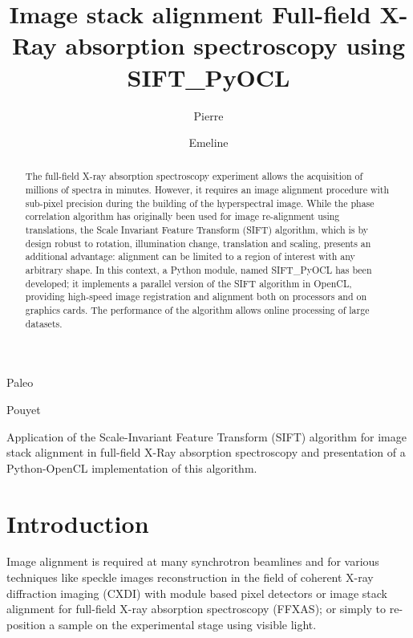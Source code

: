 \documentclass[preprint]{iucr}
\begin{document}
\title{Image stack alignment Full-field X-Ray absorption spectroscopy using
SIFT\_PyOCL}

    \author[a]{Pierre}{Paleo}
    \author[a]{Emeline}{Pouyet}

\maketitle

\begin{synopsis}
Application of the Scale-Invariant Feature Transform (SIFT) algorithm for image
stack alignment in full-field X-Ray absorption spectroscopy and presentation of
a Python-OpenCL implementation of this algorithm.
\end{synopsis}

\begin{abstract}
The full-field X-ray absorption spectroscopy experiment allows the acquisition
of millions of spectra in minutes. However, it requires an image alignment
procedure with sub-pixel precision during the building of the
hyperspectral image.
While the phase correlation algorithm has originally been used for image
re-alignment using translations, the Scale Invariant Feature Transform (SIFT)
algorithm, which is by design robust to rotation, illumination change,
translation and scaling, presents an additional advantage: alignment can be limited to
a region of interest with any arbitrary shape.
In this context, a Python module, named  SIFT\_PyOCL has been developed; 
it implements a parallel version of the SIFT algorithm in OpenCL, providing
high-speed image registration and alignment both on processors and on graphics cards. 
The performance of the algorithm allows online processing of large datasets.

\end{abstract}

\section{Introduction}

Image alignment is required at many synchrotron beamlines and for
various techniques like speckle images reconstruction in the field of coherent
X-ray diffraction imaging (CXDI) with module based pixel detectors or image
stack alignment for full-field X-ray absorption spectroscopy (FFXAS); or
simply to re-position a sample on the experimental stage using visible light.
\end{document}
